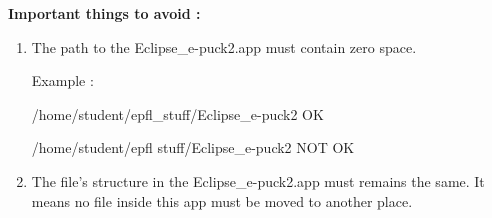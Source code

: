 \documentclass[a4paper]{article}
\begin{document}
\textbf{Important things to avoid :}

\begin{enumerate}
\item The path to the Eclipse\_e-puck2.app must contain zero space. 

Example :

/home/student/epfl\_stuff/Eclipse\_e-puck2 OK

/home/student/epfl stuff/Eclipse\_e-puck2 NOT OK

\item The file's structure in the Eclipse\_e-puck2.app must remains the same. It means no file inside this app must be moved to another place.
\end{enumerate}
\end{document}
